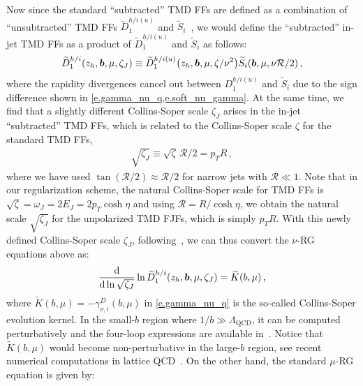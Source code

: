 \documentclass[a4paper, 11 pt]{article}
\begin{document}
Now since the standard ``subtracted'' TMD FFs are defined as a combination of ``unsubtracted'' TMD FFs $\widetilde{D}_1^{h/i(u)}$ and $\widetilde{S}_i$~\cite{Boussarie:2023izj}, we would define the ``subtracted'' in-jet TMD FFs as a product of $\widetilde{D}_1^{h/i(u)}$ and $\widetilde{S}_i$ as follows:
\begin{align}
\label{e.TMD_proper}
\widetilde{D}_1^{h/i} \pqty{z_h, \boldsymbol{b}, \mu, \zeta_J}
\equiv
\widetilde{D}_1^{h/i(u)} \pqty{z_h, \boldsymbol{b}, \mu, \zeta/\nu^2}  \widetilde{S}_i(\boldsymbol{b}, \mu, \nu \mathcal{R}/2)
\, ,
\end{align}
where the rapidity divergences cancel out between $D_1^{h/i(u)}$ and $\widetilde{S}_i$ due to the sign difference shown in \cref{e.gamma_nu_q,e.soft_nu_gamma}.
At the same time, we find that a slightly different Collins-Soper scale $\zeta_J$ arises in the in-jet ``subtracted'' TMD FFs, which is related to the Collins-Soper scale $\zeta$ for the standard TMD FFs,
\begin{align}
\sqrt{\zeta_J}
\equiv \sqrt{\zeta}\, \mathcal{R}/2
= p_T R
\, , \label{e.zeta_J}
\end{align}
where we have used $\tan(\mathcal{R}/2)\approx \mathcal{R}/2$ for narrow jets with $\mathcal{R} \ll 1$.
Note that in our regularization scheme, the natural Collins-Soper scale for TMD FFs is $\sqrt{\zeta} = \omega_J = 2 E_J = 2 p_T \cosh{\eta}$ and using $\mathcal{R} = R/\cosh{\eta}$, we obtain the natural scale $\sqrt{\zeta_J}$ for the unpolarized TMD FJFs, which is simply $p_TR$.
With this newly defined Collins-Soper scale $\zeta_J$, following~\cite{Boussarie:2023izj, Ebert:2019okf}, we can thus convert the $\nu$-RG equations above as:
\begin{align}
\frac{\dd{}}{\dd{\ln{\sqrt{\zeta_J}}}} \ln{\widetilde{D}_1^{h/i} \pqty{z_h, \boldsymbol{b}, \mu, \zeta_J}}
=
\widetilde{K}(b, \mu)
\, ,\label{e.zeta_J_D}
\end{align}
where $\widetilde{K}(b, \mu) = -\gamma_{\nu, i}^D (b,\mu)$ in \cref{e.gamma_nu_q} is the so-called Collins-Soper evolution kernel.
In the small-$b$ region where $1/b \gg \Lambda_{\mathrm{QCD}}$, it can be computed perturbatively and the four-loop expressions are available in~\cite{Moult:2022xzt, Duhr:2022yyp}. Notice that $\widetilde{K}(b, \mu)$ would become non-perturbative in the large-$b$ region, see recent numerical computations in lattice QCD~\cite{Shanahan:2021tst, LPC:2022ibr, LatticePartonLPC:2023pdv, Shu:2023cot, Avkhadiev:2023poz}.
On the other hand, the standard $\mu$-RG equation is given by:
\end{document}
